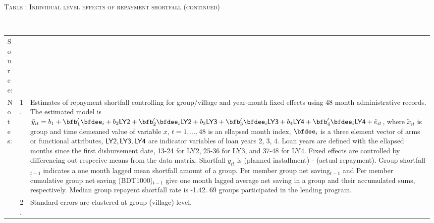 \addtocounter{table}{-1}
\hspace{-1cm}\begin{minipage}[t]{14cm}
\hfil\textsc{\normalsize Table \thetable: Individual level effects of repayment shortfall (continued)\label{tab shortfall indiv o800 2}}\\
\setlength{\tabcolsep}{1pt}
\setlength{\baselineskip}{8pt}
\renewcommand{\arraystretch}{.6}
\hfil{}\\
\renewcommand{\arraystretch}{.8}
\setlength{\tabcolsep}{1pt}
\begin{tabular}{>{\hfill\scriptsize}p{1cm}<{}>{\hfill\scriptsize}p{.25cm}<{}>{\scriptsize}p{12cm}<{\hfill}}
Source:& \multicolumn{2}{l}{\scriptsize Estimated with GUK administrative data.}\\
Notes: & 1. & Estimates of repayment shortfall controlling for group/village and year-month fixed effects using 48 month administrative records. The estimated model is $\tilde{y}_{it}=b_{1}+\bfb'_{1}\bfdee_{i}+b_{2}\mbox{\textsf{LY2}}+\bfb'_{2}\bfdee_{i}\mbox{\textsf{LY2}}+b_{3}\mbox{\textsf{LY3}}+\bfb'_{3}\bfdee_{i}\mbox{\textsf{LY3}}+b_{4}\mbox{\textsf{LY4}}+\bfb'_{4}\bfdee_{i}\mbox{\textsf{LY4}}+\tilde{e}_{it}$, where $\tilde{x}_{it}$ is group and time demeaned value of variable $x$, $t=1,\dots, 48$ is an ellapsed month index, $\bfdee_{i}$ is a three element vector of arms or functional attributes, $\mbox{\textsf{LY2}}, \mbox{\textsf{LY3}}, \mbox{\textsf{LY4}}$ are indicator variables of loan years 2, 3, 4. Loan years are defined with the ellapsed months since the first disbursement date, 13-24 for \textsf{LY2}, 25-36 for \textsf{LY3}, and 37-48 for \textsf{LY4}. Fixed effects are controlled by differencing out respecive means from the data matrix. Shortfall $y_{it}$ is (planned installment) - (actual repayment). \textsf{Group shortfall}$_{t-1}$ indicates a one month lagged mean shortfall amount of a group. \textsf{Per member group net saving}$_{t-1}$ and \textsf{Per member cumulative group net saving (BDT1000)}$_{t-1}$ give one month lagged average net saving in a group and their accumulated sums, respectively. Median group repayent shortfall rate is -1.42. 69 groups participated in the lending program. \\
& 2. & Standard errors are clustered at group (village) level.
\end{tabular}
\end{minipage}

